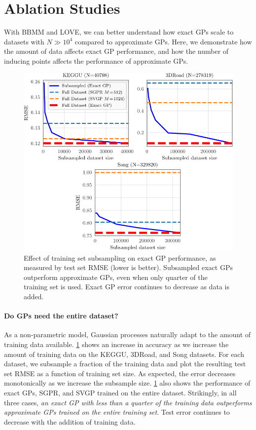 \section{Ablation Studies}
With BBMM and LOVE, we can better understand how exact GPs scale to datasets with $N\gg 10^4$ compared to approximate GPs.
Here, we demonstrate how the amount of data affects exact GP performance, and how the number of inducing points affects the performance of approximate GPs.

\begin{figure}[t!]
  \centering
  \includegraphics[width=0.7\linewidth]{figures/subsampling.pdf}
  \caption[Effect of training set subsampling on exact GP performance.]{
    Effect of training set subsampling on exact GP performance, as measured by test set RMSE (lower is better).
    Subsampled exact GPs outperform approximate GPs, even when only quarter of the training set is used.
    Exact GP error continues to decrease as data is added.
  }
  \label{fig:subsampling_results}
\end{figure}

\paragraph{Do GPs need the entire dataset?}
As a non-parametric model, Gaussian processes naturally adapt to the amount of training data available.
\cref{fig:subsampling_results} shows an increase in accuracy as we increase the amount of training data on the KEGGU, 3DRoad, and Song datasets.
For each dataset, we subsample a fraction of the training data and plot the resulting test set RMSE as a function of training set size.
As expected, the error decreases monotonically as we increase the subsample size.
\cref{fig:subsampling_results} also shows the performance of exact GPs, SGPR, and SVGP trained on the entire dataset.
Strikingly, in all three cases, \textit{an exact GP with less than a quarter of the training data outperforms approximate GPs trained on the entire training set}.
Test error continues to decrease with the addition of training data.

